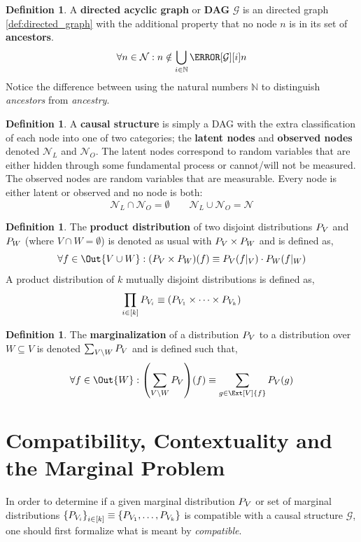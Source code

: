 \documentclass[aps, 10pt, english, twoside, pra, nofootinbib, longbibliography]{revtex4-1}
\theoremstyle{plain}
\theoremstyle{definition}
\newtheorem{definition}[theorem]{Definition}
\theoremstyle{remark}
\newcommand{\graph}{\mathcal{G}}
\newcommand{\nodes}{\mathcal{N}}
\newcommand{\term}[1]{\textcolor{Mahogany}{\textbf{#1}}}
\begin{document}
    \begin{definition}
        \label{def:dag}
        A \term{directed acyclic graph} or \term{DAG} $\graph$ is an directed graph \cref{def:directed_graph} with the additional property that no node $n$ is in its set of \term{ancestors}.
        \[ \forall n \in \nodes : n \notin \bigcup_{i\in\mathbb{N}} \Pa[\graph][i]{n}\]
        Notice the difference between using the natural numbers $\mathbb{N}$ to distinguish \textit{ancestors} from \textit{ancestry}.
    \end{definition}

    \begin{definition}
        A \term{causal structure} is simply a DAG with the extra classification of each node into one of two categories; the \term{latent nodes} and \term{observed nodes} denoted $\nodes_L$ and $\nodes_O$. The latent nodes correspond to random variables that are either hidden through some fundamental process or cannot/will not be measured. The observed nodes are random variables that are measurable. Every node is either latent or observed and no node is both:
        \[ \nodes_L \cap \nodes_O = \emptyset \qquad \nodes_L \cup \nodes_O = \nodes \]
    \end{definition}

    \begin{definition}
        The \term{product distribution} of two disjoint distributions $\prob[V]$ and $\prob[W]$ (where $V \cap W = \emptyset$) is denoted as usual with $\prob[V] \times \prob[W]$ and is defined as,
        \[ \forall f \in \Out{V \cup W} : \br{\prob[V] \times \prob[W]}\br{f} \defined \prob[V][f|_{V}]\cdot\prob[W][f|_{W}] \]
        A product distribution of $k$ mutually disjoint distributions is defined as,
        \[ \prod_{i\in\bs{k}} \prob[V_i] \defined \br{\prob[V_1] \times \cdots \times \prob[V_k]} \]
    \end{definition}

    \begin{definition}
        The \term{marginalization} of a distribution $\prob[V]$ to a distribution over $W \subseteq V$ is denoted $\sum_{V \setminus W} \prob[V]$ and is defined such that,
        \[ \forall f \in \Out{W} : \br{\sum_{V \setminus W} \prob[V]}\br{f} \defined \sum_{g \in \Ext[V]{f}} \prob[V][g] \]
    \end{definition}

    \section{Compatibility, Contextuality and the Marginal Problem}
    \label{sec:comp_con_mp}
    In order to determine if a given marginal distribution $\prob[V]$ or set of marginal distributions $\bc{\prob[V_i]}_{i \in \bs{k}} \defined \bc{\prob[V_1], \ldots, \prob[V_k]}$ is compatible with a causal structure $\graph$, one should first formalize what is meant by \textit{compatible}.
\end{document}

